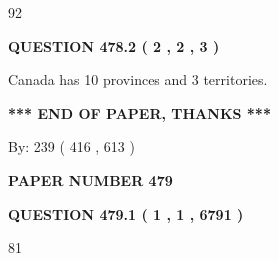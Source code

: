 \documentclass[12pt]{article}
\begin{document}
  
 
 
\noindent{}

92
 
 
  
\vspace{0.2in}
  
{\textbf{\Large{QUESTION
478.2 
 ( 2 , 2 , 3 )
}}}
  
  
 
 
\noindent{}
 
 
Canada has 10  provinces and 3 territories.
 
 
 
 
   
   
 \vspace{0.2in}
 
   
   
   
   
\vspace{1.0in} 
{\textbf{\large{ *** END OF PAPER, THANKS *** }}} 
   
   
\hspace{1.0in} By: 
 239 ( 416 ,  613 )
   
   
   
   
\newpage 
\setcounter{page}{ 
   479001 } 
   
   
   
   
 {\textbf{ \Large{ PAPER NUMBER  479  }}}
   
   
\vspace{0.2in}
   
   
   
   
   
   
 \vspace{0.2in}
 
 
 
 
   
   
  
\vspace{0.2in}
  
{\textbf{\Large{QUESTION
479.1 
 ( 1 , 1 , 6791 )
}}}
  
  
 
 
\noindent{}

81
 
\end{document}

